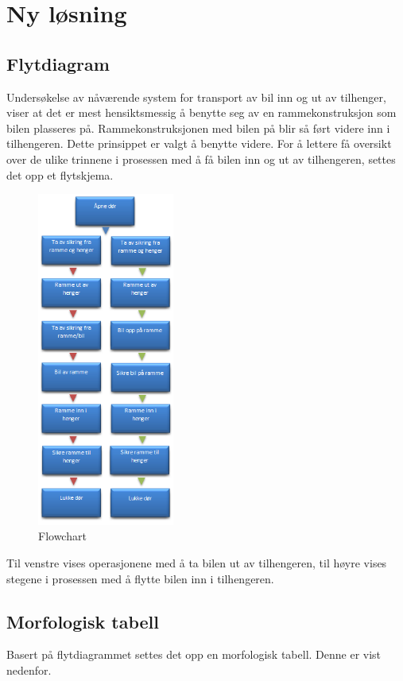 \section{Ny løsning}
\subsection{Flytdiagram}
\begin{flushleft}
Undersøkelse av nåværende system for transport av bil inn og ut av tilhenger, viser at det er mest hensiktsmessig å benytte seg av en rammekonstruksjon som bilen plasseres på. Rammekonstruksjonen med bilen på blir så ført videre inn i tilhengeren. Dette prinsippet er valgt å benytte videre. For å lettere få oversikt over de ulike trinnene i prosessen med å få bilen inn og ut av tilhengeren, settes det opp et flytskjema.
\end{flushleft}

\begin{figure}[h!tb]
\begin{center}
\leavevmode
\includegraphics[width=0.4\textwidth]{images/Bildet_3}
\end{center}
\caption{Flowchart}
\label{fig:flowchart}
\end{figure}

\begin{flushleft}
Til venstre vises operasjonene med å ta bilen ut av tilhengeren, til høyre vises stegene i prosessen med å flytte bilen inn i tilhengeren.\newpage

\subsection{Morfologisk tabell}
Basert på flytdiagrammet settes det opp en morfologisk tabell. Denne er vist nedenfor.
\end{flushleft}


